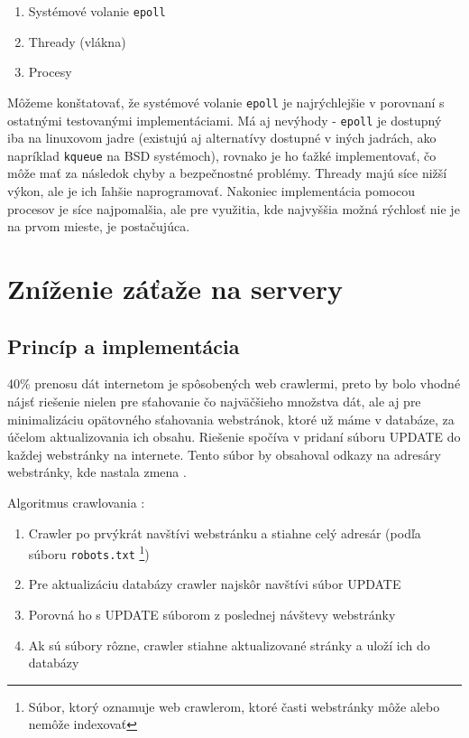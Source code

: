 \documentclass[10pt,twoside,slovak,a4paper]{article}
\begin{document}
\begin{enumerate}
    \item Systémové volanie \texttt{epoll}
    \item Thready (vlákna)
    \item Procesy
\end{enumerate}

Môžeme konštatovať, že systémové volanie \texttt{epoll} je najrýchlejšie v porovnaní s ostatnými testovanými implementáciami. Má aj nevýhody - \texttt{epoll} je dostupný iba na linuxovom jadre (existujú aj alternatívy dostupné v iných jadrách, ako napríklad \texttt{kqueue} na BSD systémoch), rovnako je ho ťažké implementovať, čo môže mať za následok chyby a bezpečnostné problémy. Thready majú síce nižší výkon, ale je ich ľahšie naprogramovať. Nakoniec implementácia pomocou procesov je síce najpomalšia, ale pre využitia, kde najvyššia možná rýchlosť nie je na prvom mieste, je postačujúca. \cite{9648837}

\section{Zníženie záťaže na servery}

\subsection{Princíp a implementácia}

40\% prenosu dát internetom je spôsobených web crawlermi, preto by bolo vhodné nájsť riešenie nielen pre sťahovanie čo najväčšieho množstva dát, ale aj pre minimalizáciu opätovného sťahovania webstránok, ktoré už máme v databáze, za účelom aktualizovania ich obsahu. Riešenie spočíva v pridaní súboru UPDATE do každej webstránky na internete. Tento súbor by obsahoval odkazy na adresáry webstránky, kde nastala zmena \cite{mishra2010smart}.

Algoritmus crawlovania \cite{mishra2010smart}:

\begin{enumerate}
    \item Crawler po prvýkrát navštívi webstránku a stiahne celý adresár (podľa súboru \texttt{robots.txt} \footnote{Súbor, ktorý oznamuje web crawlerom, ktoré časti webstránky môže alebo nemôže indexovať})
    \item Pre aktualizáciu databázy crawler najskôr navštívi súbor UPDATE
    \item Porovná ho s UPDATE súborom z poslednej návštevy webstránky
    \item Ak sú súbory rôzne, crawler stiahne aktualizované stránky a uloží ich do databázy
\end{enumerate}
\end{document}
